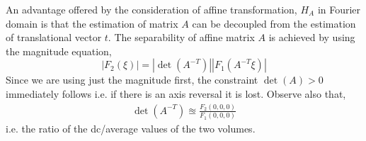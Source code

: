 \documentclass{UCF_ETD}
\begin{document}
An advantage offered by the consideration of affine transformation, $H_A$ in Fourier domain is that the estimation of matrix $A$ can be decoupled from the estimation of translational vector $t$. The separability of affine matrix $A$ is achieved by using the magnitude equation,
\begin{equation} \label{AffineTransFourierMag3D}
|F_2(\xi)| =  |\det(A^{-T})| |F_1(A^{-T}\xi)| 
\end{equation}
Since we are using just the magnitude first, the constraint $\det(A) > 0$ immediately follows i.e. if there is an axis reversal it is lost. Observe also that, 
\begin{eqnarray} \label{Determinant3D}
    \det(A^{-T}) \approxeq \frac{F_2(0,0,0)}{F_1(0,0,0)}
    \end{eqnarray}
 i.e. the ratio of the dc/average values of the two volumes.
\end{document}
